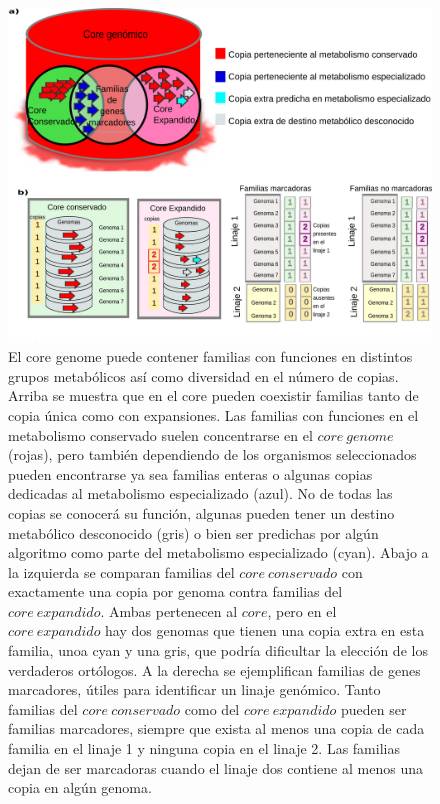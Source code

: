 \documentclass[]{article}
\begin{document}
\begin{figure}[h!tbp]
\centering
\includegraphics[angle = 0,scale = .8]{chapter1/CoreMarcadores.png}
\caption[Core y genes Marcadores]{\footnotesize{El core genome puede contener familias con funciones en distintos grupos metabólicos así como diversidad en el número de copias. Arriba se muestra que en el core pueden coexistir familias tanto de copia única como con expansiones. Las familias con funciones en el metabolismo conservado suelen concentrarse en el $core~genome$ (rojas), pero también dependiendo de los organismos seleccionados pueden encontrarse ya sea familias enteras o algunas copias dedicadas al metabolismo especializado (azul). No de todas las copias se conocerá su función, algunas pueden tener un destino metabólico desconocido (gris) o bien ser predichas por algún algoritmo como parte del metabolismo especializado (cyan).  Abajo a la izquierda se comparan familias del $core~conservado$ con exactamente una copia por genoma contra familias del $core~expandido$. Ambas pertenecen al $core$, pero en el $core~expandido$ hay dos genomas que tienen una copia extra en esta familia, unoa cyan y una gris, que podría dificultar la elección de los verdaderos ortólogos. A la derecha se ejemplifican familias de genes marcadores, útiles para identificar un linaje genómico. Tanto familias del $core~conservado$ como del $core~expandido$ pueden ser familias marcadores, siempre que exista al menos una copia de cada familia en el linaje 1 y ninguna copia en el linaje 2. Las familias dejan de ser marcadoras cuando el linaje dos contiene al menos una copia en algún genoma.}}
\label{fig:CoreMarcadores}
\end{figure}
\end{document}
